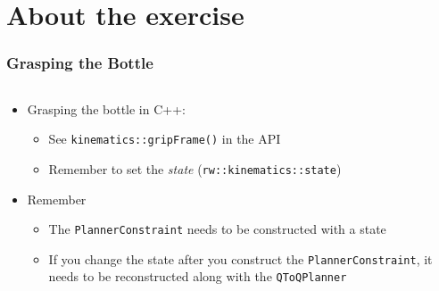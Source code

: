 \documentclass{beamer}
\begin{document}
\section{About the exercise}

\begin{frame}
  \frametitle{Grasping the Bottle}
  \begin{columns}
    \begin{column}{0.7\textwidth}
      \begin{itemize}
      \item Grasping the bottle in C++:
        \begin{itemize}
        \item See \texttt{kinematics::gripFrame()} in the API
        \item Remember to set the \textit{state} (\texttt{rw::kinematics::state})
        \end{itemize}
      \item Remember
        \begin{itemize}
        \item The \texttt{PlannerConstraint} needs to be constructed with a state
          \item If you change the state after you construct the \texttt{PlannerConstraint}, it needs to be reconstructed along with the \texttt{QToQPlanner}
        \end{itemize}
      \end{itemize}
    \end{column}
    \begin{column}{0.3\textwidth}
      \begin{center}

\end{center}
\end{column}
\end{columns}
\end{frame}
\end{document}
